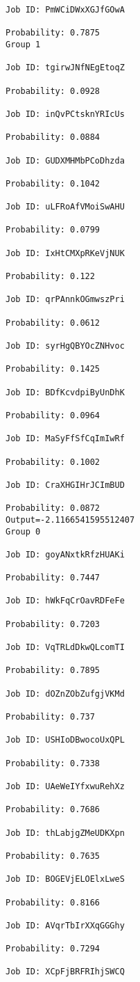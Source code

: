 \documentclass[11pt]{article}
\begin{document}
\begin{Verbatim}[commandchars=\\\{\}]
Job ID: PmWCiDWxXGJfGOwA

Probability: 0.7875
Group 1

Job ID: tgirwJNfNEgEtoqZ

Probability: 0.0928

Job ID: inQvPCtsknYRIcUs

Probability: 0.0884

Job ID: GUDXMHMbPCoDhzda

Probability: 0.1042

Job ID: uLFRoAfVMoiSwAHU

Probability: 0.0799

Job ID: IxHtCMXpRKeVjNUK

Probability: 0.122

Job ID: qrPAnnkOGmwszPri

Probability: 0.0612

Job ID: syrHgQBYOcZNHvoc

Probability: 0.1425

Job ID: BDfKcvdpiByUnDhK

Probability: 0.0964

Job ID: MaSyFfSfCqImIwRf

Probability: 0.1002

Job ID: CraXHGIHrJCImBUD

Probability: 0.0872
Output=-2.1166541595512407
Group 0

Job ID: goyANxtkRfzHUAKi

Probability: 0.7447

Job ID: hWkFqCrOavRDFeFe

Probability: 0.7203

Job ID: VqTRLdDkwQLcomTI

Probability: 0.7895

Job ID: dOZnZObZufgjVKMd

Probability: 0.737

Job ID: USHIoDBwocoUxQPL

Probability: 0.7338

Job ID: UAeWeIYfxwuRehXz

Probability: 0.7686

Job ID: thLabjgZMeUDKXpn

Probability: 0.7635

Job ID: BOGEVjELOElxLweS

Probability: 0.8166

Job ID: AVqrTbIrXXqGGGhy

Probability: 0.7294

Job ID: XCpFjBRFRIhjSWCQ


\end{Verbatim}
\end{document}
